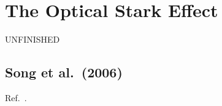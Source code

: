 






\section{The Optical Stark Effect}
{\color{red} UNFINISHED}

\subsection{Song et al.\ (2006)}
Ref.\ \cite{song2006optical}.

